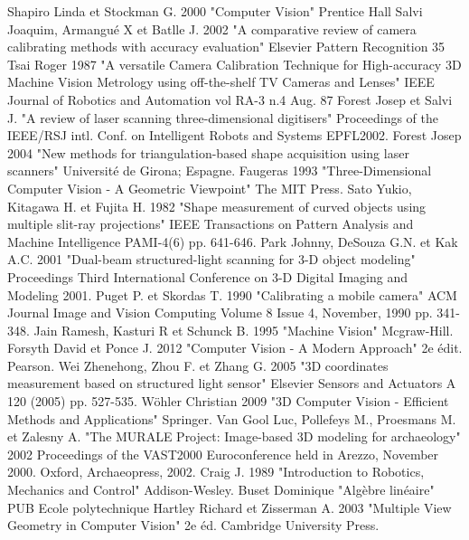 \documentclass[a4paper,10pt]{report}
\begin{document}
\newpage


\begin{thebibliography}{1}
 Shapiro Linda et Stockman G. 2000 "Computer Vision" Prentice Hall
 Salvi Joaquim, Armangué X et Batlle J. 2002 "A comparative review of camera calibrating methods with accuracy evaluation" Elsevier Pattern Recognition 35
 Tsai Roger 1987 "A versatile Camera Calibration Technique for High-accuracy 3D Machine Vision Metrology using off-the-shelf TV Cameras and Lenses" IEEE Journal of Robotics and Automation vol RA-3 n.4 Aug. 87
 Forest Josep et Salvi J. "A review of laser scanning three-dimensional digitisers" Proceedings of the IEEE/RSJ intl. Conf. on Intelligent Robots and Systems EPFL2002.
 Forest Josep 2004 "New methods for triangulation-based shape acquisition using laser scanners" Université de Girona; Espagne.
 Faugeras 1993 "Three-Dimensional Computer Vision - A Geometric Viewpoint" The MIT Press.
 Sato Yukio, Kitagawa H. et Fujita H. 1982 "Shape measurement of curved objects using multiple slit-ray projections" IEEE Transactions on Pattern Analysis and Machine Intelligence PAMI-4(6) pp. 641-646.
 Park Johnny, DeSouza G.N. et Kak A.C. 2001 "Dual-beam structured-light scanning for 3-D object modeling" Proceedings Third International Conference on 3-D Digital Imaging and Modeling 2001.
 Puget P. et Skordas T. 1990 "Calibrating a mobile camera" ACM Journal Image and Vision Computing Volume 8 Issue 4, November, 1990 pp. 341-348.
 Jain Ramesh, Kasturi R et Schunck B. 1995 "Machine Vision" Mcgraw-Hill.
 Forsyth David et Ponce J. 2012 "Computer Vision - A Modern Approach" 2e édit. Pearson.
 Wei Zhenehong, Zhou F. et Zhang G. 2005 "3D coordinates measurement based on structured light sensor" Elsevier Sensors and Actuators A 120 (2005) pp. 527-535.
 Wöhler Christian 2009 "3D Computer Vision - Efficient Methods and Applications" Springer.
 Van Gool Luc, Pollefeys M., Proesmans M. et Zalesny A. "The MURALE Project: Image-based 3D modeling for archaeology" 2002 Proceedings of the VAST2000 Euroconference held in Arezzo, November 2000. Oxford, Archaeopress, 2002.
 Craig J. 1989 "Introduction to Robotics, Mechanics and Control" Addison-Wesley.
 Buset Dominique "Algèbre linéaire" PUB Ecole polytechnique
 Hartley Richard et Zisserman A. 2003 "Multiple View Geometry in Computer Vision" 2e éd. Cambridge University Press.

\end{thebibliography}
\end{document}
